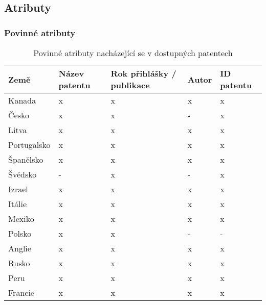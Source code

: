 \subsection{Atributy}\label{subsec:atributy}
\subsubsection{Povinné atributy}

	\begin{table}[H]
	\centering
	\begin{tabular}{|>{\centering\arraybackslash}p{2.2cm}|>{\centering\arraybackslash}p{2cm}|>{\centering\arraybackslash}p{3cm}|>{\centering\arraybackslash}p{2cm}|>{\centering\arraybackslash}p{2.5cm}|} 
	\hline
	\textbf{Země}    & \textbf{Název patentu} & \textbf{Rok přihlášky / publikace} & \textbf{Autor} & \textbf{ID patentu}                \\ 
	\hline
	Kanada & x & x & x & x \\
	\hline
	Česko & x & x & - & x \\
	\hline
	Litva & x & x & x & x \\
	\hline
	Portugalsko & x & x & x & x \\
	\hline
	Španělsko & x & x & x & x \\
	\hline
	Švédsko & - & x & - & x \\
	\hline
	Izrael & x & x & x & x \\
	\hline
	Itálie & x & x & x & x \\
	\hline
	Mexiko & x & x & x & x \\
	\hline
	Polsko & x & x & - & - \\
	\hline
	Anglie & x & x & x & x \\
	\hline
	Rusko & x & x & x & x \\
	\hline
	Peru & x & x & x & x \\
	\hline
	Francie & x & x & x & x \\
	\hline
	\end{tabular}
	\caption{Povinné atributy nacházející se v dostupných patentech}
	\label{tab:table_attributes_critical}
	\end{table}

